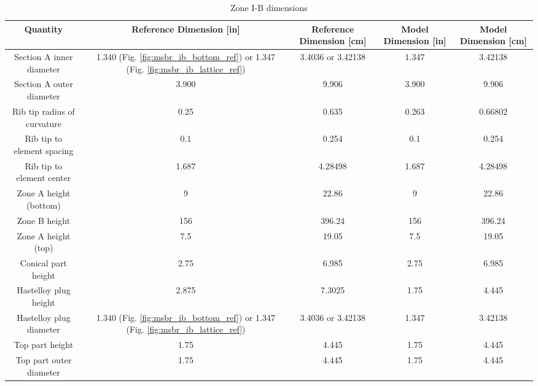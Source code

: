 \begin{table}[htpb]
    \centering
    \caption{Zone I-B dimensions}
    \label{tab:zone-ib-specs}
    \begin{tabulary}{\linewidth}{|C|CC|CC|}
    \hline
    Quantity & Reference Dimension [in] & Reference Dimension [\unit{\centi\metre}] & Model Dimension [in] & Model Dimension [\unit{\centi\metre}]\\
    \hline
    Section A inner diameter & 1.340 (Fig. \ref{fig:msbr_ib_bottom_ref}) or 1.347 (Fig. \ref{fig:msbr_ib_lattice_ref}) & 3.4036 or 3.42138 & 1.347 & 3.42138 \\
    \hline
    Section A outer diameter & 3.900 & 9.906 & 3.900 & 9.906 \\
    \hline
    Rib tip radius of curvature & 0.25 & 0.635 & 0.263 & 0.66802\\
    \hline
    Rib tip to element spacing & 0.1 & 0.254 & 0.1 & 0.254\\
    \hline
    Rib tip to element center & 1.687 & 4.28498 & 1.687 & 4.28498\\
    \hline
    Zone A height (bottom) & 9 & 22.86 & 9 & 22.86\\
    \hline
    Zone B height & 156 & 396.24 & 156 & 396.24\\
    \hline
    Zone A height (top) & 7.5 & 19.05 & 7.5 & 19.05\\
    \hline
    Conical part height & 2.75 & 6.985 & 2.75 & 6.985\\
    \hline
    Hastelloy plug height & 2.875 & 7.3025 & 1.75 & 4.445 \\
    \hline
    Hastelloy plug diameter & 1.340 (Fig. \ref{fig:msbr_ib_bottom_ref}) or 1.347 (Fig. \ref{fig:msbr_ib_lattice_ref}) & 3.4036 or 3.42138 & 1.347 & 3.42138 \\
    \hline
    Top part height & 1.75 & 4.445 & 1.75 & 4.445 \\
    \hline
    Top part outer diameter & 1.75 & 4.445 & 1.75 & 4.445\\
    \hline
    \end{tabulary}
\end{table}


